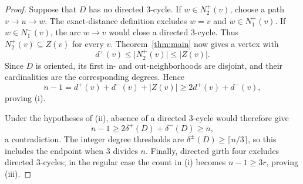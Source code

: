 \documentclass[11pt]{article}
\theoremstyle{remark}
\newcommand{\abs}[1]{\lvert #1\rvert}
\begin{document}
\begin{proof}
Suppose that \(D\) has no directed \(3\)-cycle.  If \(w\in N_2^+(v)\),
choose a path \(v\to u\to w\).  The exact-distance definition excludes
\(w=v\) and \(w\in N_1^+(v)\).  If \(w\in N_1^-(v)\), the arc \(w\to v\)
would close a directed \(3\)-cycle.  Thus
\(N_2^+(v)\subseteq Z(v)\) for every \(v\).  Theorem~\ref{thm:main}
now gives a vertex with
\[
 d^+(v)\leq\abs{N_2^+(v)}\leq\abs{Z(v)}.
\]
Since \(D\) is oriented, its first in- and out-neighborhoods are disjoint,
and their cardinalities are the corresponding degrees.  Hence
\[
 n-1=d^+(v)+d^-(v)+\abs{Z(v)}
 \geq 2d^+(v)+d^-(v),
\]
proving \textup{(i)}.

Under the hypotheses of \textup{(ii)}, absence of a directed \(3\)-cycle
would therefore give
\[
 n-1\geq2\delta^+(D)+\delta^-(D)\geq n,
\]
a contradiction.  The integer degree thresholds are
\(\delta^\pm(D)\geq\lceil n/3\rceil\), so this includes the endpoint
when \(3\) divides \(n\).  Finally, directed girth four excludes directed
\(3\)-cycles; in the regular case the count in \textup{(i)} becomes
\(n-1\geq3r\), proving \textup{(iii)}.
\end{proof}




\end{document}
